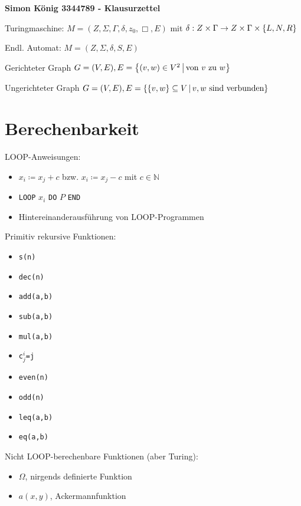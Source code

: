 \documentclass[landscape, 8pt, a4paper]{extarticle}
\newcommand{\N}{\mathbb{N}}
\newcommand{\set}[2]{\ensuremath\left\{ #1 \,\middle|\, #2 \right\}}
\newcommand{\simpleset}[1]{\ensuremath\left\{ #1 \right\}}
\begin{document}
\begin{multicols}{3}
	\textbf{Simon König 3344789 - Klausurzettel}

	Turingmaschine: $M=(Z,\Sigma,\Gamma,\delta,z_0,\Box,E)$ mit $\delta: Z\times\Gamma\rightarrow Z\times\Gamma\times\simpleset{L,N,R}$

	Endl. Automat: $M=(Z,\Sigma, \delta, S, E)$

	Gerichteter Graph $G=(V,E), E= \set{(v,w)\in V^2}{\text{von $v$ zu $w$}}$

	Ungerichteter Graph $G=(V,E), E= \set{\simpleset{v,w}\subseteq V}{\text{$v,w$ sind verbunden}}$

	\section{Berechenbarkeit}
	LOOP-Anweisungen:
	\begin{itemize}
		\item $x_i\coloneqq x_j+c$ bzw. $x_i\coloneqq x_j-c$ mit $c\in\N$
		\item \texttt{LOOP} $x_i$ \texttt{DO} $P$ \texttt{END}
		\item Hintereinanderausführung von LOOP-Programmen
	\end{itemize}

	Primitiv rekursive Funktionen:
	\begin{multicols}{2}
		\begin{itemize}
			\item \texttt{s(n)}
			\item \texttt{dec(n)}
			\item \texttt{add(a,b)}
			\item \texttt{sub(a,b)}
			\item \texttt{mul(a,b)}
			\item \texttt{c$^i_j$=j}
			\item \texttt{even(n)}
			\item \texttt{odd(n)}
			\item \texttt{leq(a,b)}
			\item \texttt{eq(a,b)}
		\end{itemize}
	\end{multicols}

	Nicht LOOP-berechenbare Funktionen (aber Turing):
	\begin{itemize}
		\item $\Omega$, nirgends definierte Funktion
		\item $a(x,y)$, Ackermannfunktion
	\end{itemize}



\end{multicols}
\end{document}
